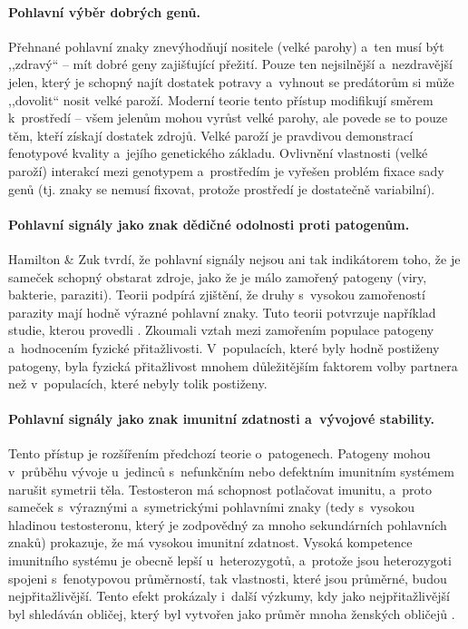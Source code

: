 \documentclass[a4paper, 12pt, notitlepage, oneside, numbers=noenddot]{report}
\begin{document}
\paragraph{Pohlavní výběr dobrých genů.}
Přehnané pohlavní znaky znevýhodňují nositele (velké parohy) a~ten
musí být ,,zdravý`` -- mít dobré geny zajišťující přežití.  Pouze ten
nejsilnější a~nezdravější jelen, který je schopný najít dostatek
potravy a~vyhnout se predátorům si může ,,dovolit`` nosit velké
paroží.  Moderní teorie tento přístup modifikují směrem k~prostředí --
všem jelenům mohou vyrůst velké parohy, ale povede se to pouze těm,
kteří získají dostatek zdrojů.  Velké paroží je pravdivou demonstrací
fenotypové kvality a~jejího genetického základu. Ovlivnění vlastnosti
(velké paroží) interakcí mezi genotypem a~prostředím je vyřešen
problém fixace sady genů (tj. znaky se nemusí fixovat, protože
prostředí je dostatečně variabilní).

\paragraph{Pohlavní signály jako znak dědičné odolnosti proti
  patogenům.}
Hamilton \& Zuk tvrdí, že pohlavní signály nejsou ani tak indikátorem
toho, že je sameček schopný obstarat zdroje, jako že je málo zamořený
patogeny (viry, bakterie, paraziti). Teorii podpírá zjištění, že druhy
s~vysokou zamořeností parazity mají hodně výrazné pohlavní znaky.
Tuto teorii potvrzuje například studie, kterou provedli
\citet{GangestadBuss1993}.  Zkoumali vztah mezi zamořením populace
patogeny a~hodnocením fyzické přitažlivosti.  V~populacích, které byly
hodně postiženy patogeny, byla fyzická přitažlivost mnohem
důležitějším faktorem volby partnera než v~populacích, které nebyly
tolik postiženy.

\paragraph{Pohlavní signály jako znak imunitní zdatnosti a~vývojové
  stability.}
Tento přístup je rozšířením předchozí teorie o~patogenech. Patogeny
mohou v~průběhu vývoje u~jedinců s~nefunkčním nebo defektním imunitním
systémem narušit symetrii těla. Testosteron má schopnost potlačovat
imunitu, a~proto sameček s~výraznými a~symetrickými pohlavními znaky
(tedy s~vysokou hladinou testosteronu, který je zodpovědný za mnoho
sekundárních pohlavních znaků) prokazuje, že má vysokou imunitní
zdatnost.  Vysoká kompetence imunitního systému je obecně lepší
u~heterozygotů, a~protože jsou heterozygoti spojeni s~fenotypovou
průměrností, tak vlastnosti, které jsou průměrné, budou
nejpřitažlivější.  Tento efekt prokázaly i~další výzkumy, kdy jako
nejpřitažlivější byl shledáván obličej, který byl vytvořen jako průměr
mnoha ženských obličejů \citep{Ridley2007}.
\end{document}
